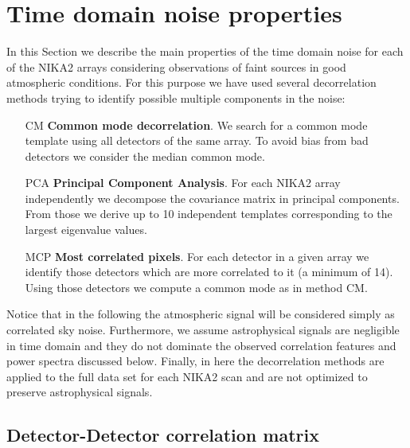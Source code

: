%
%
%
%


%
%    
%
\section{Time domain noise properties}

In this Section we describe the main properties of the time domain noise for each of the NIKA2 arrays considering
observations of faint sources in good atmospheric conditions. For this purpose we have used several decorrelation methods trying to identify possible multiple components in the noise:

\begin{enumerate}
\item[CM] {\bf Common mode decorrelation}. We search for a common mode template using all detectors of the same array. To avoid bias from bad detectors we consider the median common mode.

\item[PCA] {\bf Principal Component Analysis}. For each NIKA2 array independently we decompose the covariance matrix in principal components. From those we derive up to 10 independent templates corresponding to the largest eigenvalue values.

\item[MCP] {\bf Most correlated pixels}. For each detector in a given array we identify those detectors which are more correlated to it (a minimum of 14). Using those detectors we compute a common mode as in method CM. 

\end{enumerate}

Notice that in the following the atmospheric signal will be considered simply as correlated sky noise. Furthermore, we assume astrophysical signals are negligible in time domain and they do not dominate the observed correlation features and power spectra discussed below. Finally, in here the decorrelation methods are applied to the full data set for each NIKA2 scan and are not optimized to preserve astrophysical signals.
 
\subsection{Detector-Detector correlation matrix}


